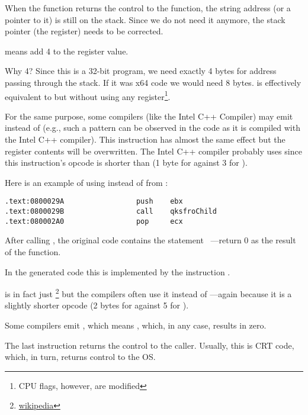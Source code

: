 When the \printf function returns the control to the \main function, the string address (or a pointer to it) is still on the stack.
Since we do not need it anymore, the \gls{stack pointer} (the \ESP register) needs to be corrected.

 means add 4 to the \ESP register value.

Why 4? Since this is a 32-bit program, we need exactly 4 bytes for address passing through the stack. If it was x64 code we would need 8 bytes.
 is effectively equivalent to  but without using any register\footnote{CPU flags, however, are modified}.

\index{\oracle}

For the same purpose, some compilers (like the Intel C++ Compiler) may emit  
instead of \ADD (e.g., such a pattern can be observed in the \oracle{} code as it is compiled with the Intel C++ compiler).
This instruction has almost the same effect but the \ECX register contents will be overwritten.
The Intel C++ compiler probably uses  since this instruction's opcode is shorter than  (1 byte for  against 3 for ).

Here is an example of using \POP instead of \ADD from \oracle{}:

\begin{lstlisting}[caption=\oracle 10.2 Linux (app.o file)]
.text:0800029A                 push    ebx
.text:0800029B                 call    qksfroChild
.text:080002A0                 pop     ecx
\end{lstlisting}

After calling \printf, the original \CCpp code contains the statement ~---return 0 as the result of the \main function.

In the generated code this is implemented by the instruction .


\XOR is in fact just \footnote{\href{http://go.yurichev.com/17118}{wikipedia}} but the compilers often use it instead of
---again because it is a slightly shorter opcode (2 bytes for \XOR against 5 for \MOV).

Some compilers emit , which means  \EAX {} \EAX, which, in any case, results in zero.

The last instruction \RET returns the control to the \gls{caller}. Usually, this is \CCpp \ac{CRT} code, which, in turn, returns control to the \ac{OS}.

